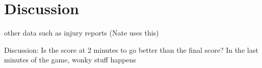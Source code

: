 \section{Discussion}
other data such as injury reports (Nate uses this)

Discussion: Is the score at 2 minutes to go better than the final score? In the last minutes of the game, wonky stuff happens
